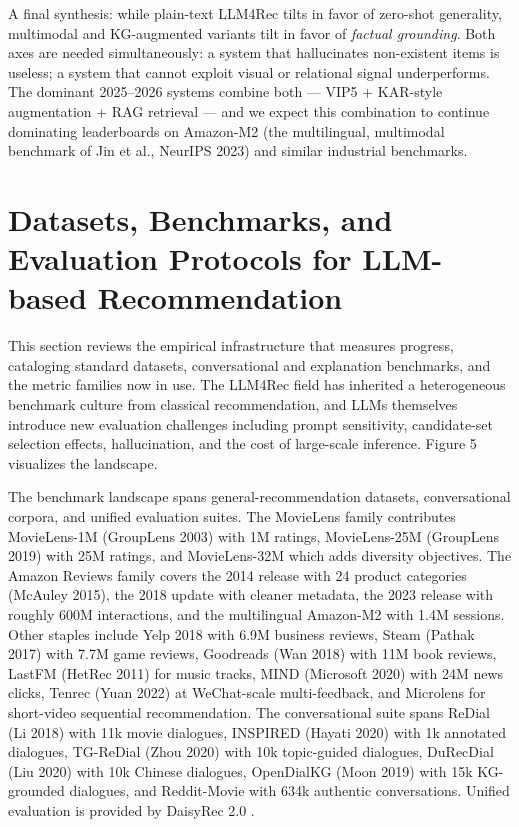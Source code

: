 \documentclass{article}
\begin{document}
A final synthesis: while plain-text LLM4Rec tilts in favor of zero-shot generality, multimodal and KG-augmented variants tilt in favor of \emph{factual grounding}. Both axes are needed simultaneously: a system that hallucinates non-existent items is useless; a system that cannot exploit visual or relational signal underperforms. The dominant 2025--2026 systems combine both --- VIP5 + KAR-style augmentation + RAG retrieval --- and we expect this combination to continue dominating leaderboards on Amazon-M2 (the multilingual, multimodal benchmark of Jin et al., NeurIPS 2023) and similar industrial benchmarks.

\section{Datasets, Benchmarks, and Evaluation Protocols for LLM-based Recommendation}\label{datasets-benchmarks-and-evaluation-protocols-for-llm-based-recommendation}

This section reviews the empirical infrastructure that measures progress, cataloging standard datasets, conversational and explanation benchmarks, and the metric families now in use. The LLM4Rec field has inherited a heterogeneous benchmark culture from classical recommendation, and LLMs themselves introduce new evaluation challenges including prompt sensitivity, candidate-set selection effects, hallucination, and the cost of large-scale inference. Figure 5 visualizes the landscape.

The benchmark landscape spans general-recommendation datasets, conversational corpora, and unified evaluation suites. The MovieLens family contributes MovieLens-1M (GroupLens 2003) with 1M ratings, MovieLens-25M (GroupLens 2019) with 25M ratings, and MovieLens-32M \citep{smucker2025arxiv2504018632025} which adds diversity objectives. The Amazon Reviews family covers the 2014 release with 24 product categories (McAuley 2015), the 2018 update with cleaner metadata, the 2023 release with roughly 600M interactions, and the multilingual Amazon-M2 \citep{jin2023amazonm2amultiling} with 1.4M sessions. Other staples include Yelp 2018 with 6.9M business reviews, Steam (Pathak 2017) with 7.7M game reviews, Goodreads (Wan 2018) with 11M book reviews, LastFM (HetRec 2011) for music tracks, MIND (Microsoft 2020) with 24M news clicks, Tenrec (Yuan 2022) at WeChat-scale multi-feedback, and Microlens for short-video sequential recommendation. The conversational suite spans ReDial (Li 2018) with 11k movie dialogues, INSPIRED (Hayati 2020) with 1k annotated dialogues, TG-ReDial (Zhou 2020) with 10k topic-guided dialogues, DuRecDial (Liu 2020) with 10k Chinese dialogues, OpenDialKG (Moon 2019) with 15k KG-grounded dialogues, and Reddit-Movie \citep{he2023largelanguagemodel} with 634k authentic conversations. Unified evaluation is provided by DaisyRec 2.0 \citep{sun2022daisyrec20benchmar}.
\end{document}
